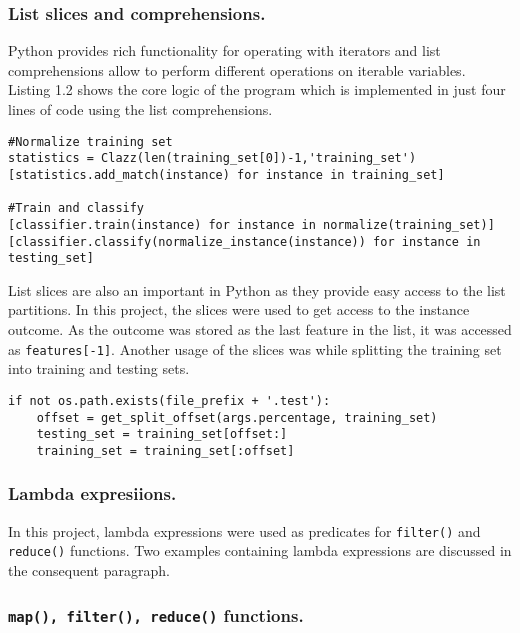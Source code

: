 \documentclass{llncs}
\begin{document}
\subsubsection{List slices and comprehensions.}

Python provides rich functionality for operating with iterators and list comprehensions allow to perform different operations on iterable variables. Listing 1.2 shows the core logic of the program which is implemented in just four lines of code using the list comprehensions.

\begin{lstlisting}[caption = Core logic of the application.]
#Normalize training set
statistics = Clazz(len(training_set[0])-1,'training_set')
[statistics.add_match(instance) for instance in training_set]

#Train and classify
[classifier.train(instance) for instance in normalize(training_set)]
[classifier.classify(normalize_instance(instance)) for instance in testing_set]
\end{lstlisting}

List slices are also an important in Python as they provide easy access to the list partitions. In this project, the slices were used to get access to the instance outcome. As the outcome was stored as the last feature in the list, it was accessed as \lstinline{features[-1]}. Another usage of the slices was while splitting the training set into training and testing sets. 

\begin{lstlisting}[caption = Splitting training set.]
if not os.path.exists(file_prefix + '.test'):
	offset = get_split_offset(args.percentage, training_set)
    testing_set = training_set[offset:]
    training_set = training_set[:offset]
\end{lstlisting}

\subsubsection{Lambda expresiions.} In this project, lambda expressions were used as predicates for \lstinline{filter()} and \lstinline{reduce()} functions. Two examples containing lambda expressions are discussed in the consequent paragraph.

\subsubsection{\lstinline{map(), filter(), reduce()} functions.}
\end{document}
